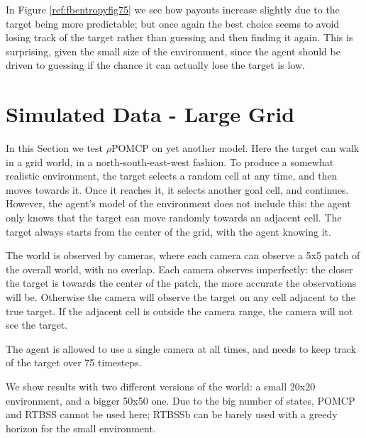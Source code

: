 In Figure \ref{ref:fbentropyfig75} we see how payouts increase slightly due to the target being more
predictable; but once again the best choice seems to avoid losing track of the target rather than
guessing and then finding it again. This is surprising, given the small size of the environment,
since the agent should be driven to guessing if the chance it can actually lose the target is low.

%

\section{Simulated Data - Large Grid}

In this Section we test $\rho$POMCP on yet another model. Here the target can walk in a grid world,
in a north-south-east-west fashion. To produce a somewhat realistic environment, the target selects
a random cell at any time, and then moves towards it. Once it reaches it, it selects another goal
cell, and continues. However, the agent's model of the environment does not include this: the agent
only knows that the target can move randomly towards an adjacent cell. The target always starts from
the center of the grid, with the agent knowing it.

The world is observed by cameras, where each camera can observe a 5x5 patch of the overall world,
with no overlap. Each camera observes imperfectly: the closer the target is towards the center
of the patch, the more accurate the observations will be. Otherwise the camera will observe the
target on any cell adjacent to the true target. If the adjacent cell is outside the camera range,
the camera will not see the target.

The agent is allowed to use a single camera at all times, and needs to keep track of the target over
75 timesteps.

We show results with two different versions of the world: a small 20x20 environment, and a bigger
50x50 one. Due to the big number of states, POMCP and RTBSS cannot be used here; RTBSSb can be
barely used with a greedy horizon for the small environment.

